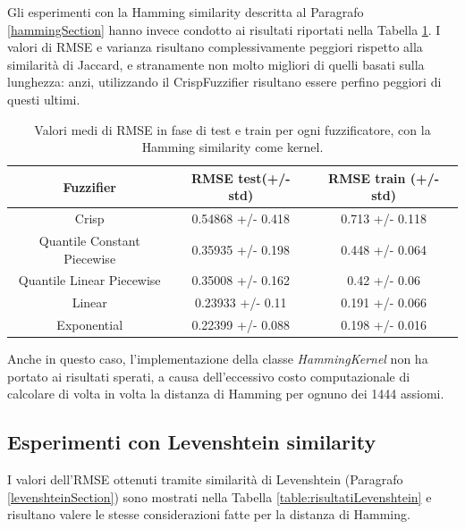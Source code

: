 \documentclass[12pt,a4paper]{report}
\begin{document}
 Gli esperimenti con la Hamming similarity descritta al Paragrafo \ref{hammingSection} hanno invece condotto ai risultati riportati nella Tabella \ref{table:risultatiHamming}. I valori di RMSE e varianza risultano complessivamente peggiori rispetto alla similarità di Jaccard, e stranamente non molto migliori di quelli basati sulla lunghezza: anzi, utilizzando il CrispFuzzifier risultano essere perfino peggiori di questi ultimi.

\begin{table}[h!]
\small
\centering 	
	\begin{tabular}{|c|c|c|} 
	 \hline
	  Fuzzifier & RMSE test(+/- std) & RMSE train (+/- std)\\ [0.5ex] 
	 \hline
	 Crisp & 0.54868 +/- 0.418 & 0.713 +/- 0.118 \\ 
	 \hline
	 Quantile Constant Piecewise & 0.35935 +/- 0.198 & 0.448 +/- 0.064\\
	 \hline
	 Quantile Linear Piecewise & 0.35008 +/- 0.162 & 0.42 +/- 0.06\\
	 \hline
	 Linear &0.23933 +/- 0.11 & 0.191 +/- 0.066\\
	 \hline
	 Exponential & 0.22399 +/- 0.088 & 0.198 +/- 0.016\\ [1ex] 
	 \hline
	\end{tabular}
	\caption{Valori medi di RMSE in fase di test e train per ogni fuzzificatore, con la Hamming similarity come kernel.}
	\label{table:risultatiHamming}
\end{table}

Anche in questo caso, l'implementazione della classe \emph{HammingKernel} non ha portato ai risultati sperati, a causa dell'eccessivo costo computazionale di calcolare di volta in volta la distanza di Hamming per ognuno dei 1444 assiomi.

\subsection{Esperimenti con Levenshtein similarity}

 I valori dell'RMSE ottenuti tramite similarità di Levenshtein (Paragrafo \ref{levenshteinSection}) sono mostrati nella Tabella \ref{table:risultatiLevenshtein} e risultano valere le stesse considerazioni fatte per la distanza di Hamming.
\end{document}
